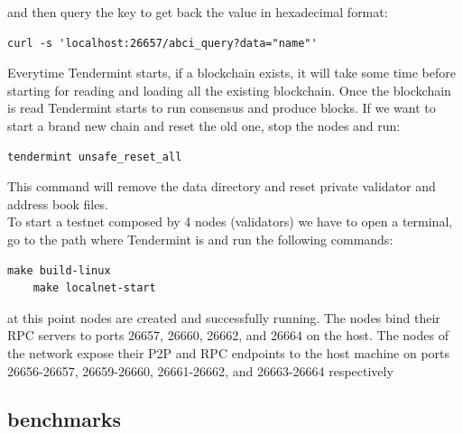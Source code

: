\documentclass{article}
\begin{document}
	and then query the key to get back the value in hexadecimal format:
	\begin{lstlisting}[style=bashstyle]
	curl -s 'localhost:26657/abci_query?data="name"'
	\end{lstlisting}
	Everytime Tendermint starts, if a blockchain exists, it will take some time before starting for reading and loading all the existing blockchain. Once the blockchain is read Tendermint starts to run consensus and produce blocks. If we want to start a brand new chain and reset the old one, stop the nodes and run:
	\begin{lstlisting}[style=bashstyle]
	tendermint unsafe_reset_all
	\end{lstlisting}
	This command will remove the data directory and reset private validator and address book files.\\
\newline
	To start a testnet composed by 4 nodes (validators) we have to open a terminal, go to the path where Tendermint is and run the following commands:
	\begin{lstlisting}[style=bashstyle]
	make build-linux   
	make localnet-start 
	\end{lstlisting}
	at this point nodes are created and successfully running. The nodes bind their RPC servers to ports 26657, 26660, 26662, and 26664 on the host.
The nodes of the network expose their P2P and RPC endpoints to the host machine on ports 26656-26657, 26659-26660, 26661-26662, and 26663-26664 respectively
	\subsection{benchmarks}
	
	

	
	
\end{document}
